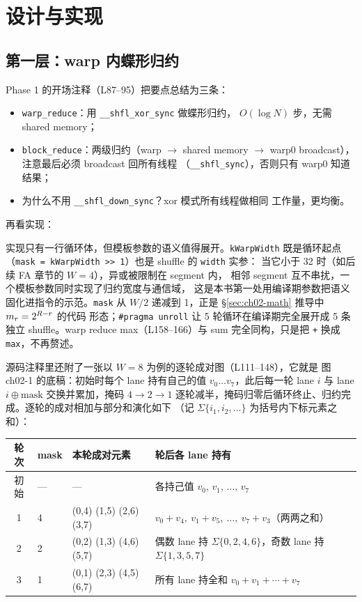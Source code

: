 \section{设计与实现}

\subsection{第一层：warp 内蝶形归约}\label{sec:ch02-warp}

Phase 1 的开场注释（L87--95）把要点总结为三条：

\begin{itemize}
\item \texttt{warp\_reduce}：用 \texttt{\_\_shfl\_xor\_sync} 做蝶形归约，
  $O(\log N)$ 步，无需 shared memory；
\item \texttt{block\_reduce}：两级归约（warp $\to$ shared memory $\to$
  warp0 broadcast），注意最后必须 broadcast 回所有线程
  （\texttt{\_\_shfl\_sync}），否则只有 warp0 知道结果；
\item 为什么不用 \texttt{\_\_shfl\_down\_sync}？xor 模式所有线程做相同
  工作量，更均衡。
\end{itemize}

再看实现：



实现只有一行循环体，但模板参数的语义值得展开。\texttt{kWarpWidth} 既是循环起点
（\texttt{mask = kWarpWidth >> 1}）也是 shuffle 的 \texttt{width} 实参：
当它小于 32 时（如后续 FA 章节的 $W = 4$），异或被限制在 segment 内，
相邻 segment 互不串扰，一个模板参数同时实现了归约宽度与通信域，
这是本书第一处用编译期参数把语义固化进指令的示范。\texttt{mask} 从
$W/2$ 递减到 1，正是 \S\ref{sec:ch02-math} 推导中 $m\sb r = 2^{R-r}$ 的代码
形态；\texttt{\#pragma unroll} 让 5 轮循环在编译期完全展开成 5 条独立
shuffle。warp reduce max（L158--166）与 sum 完全同构，只是把 \texttt{+}
换成 \texttt{max}，不再赘述。

源码注释里还附了一张以 $W=8$ 为例的逐轮成对图（L111--148），它就是
图 ch02-1 的底稿：初始时每个 lane 持有自己的值 $v_0 \dots v_7$，此后每一轮
lane $i$ 与 lane $i \oplus \mathrm{mask}$ 交换并累加，掩码 $4 \to 2 \to 1$
逐轮减半，掩码归零后循环终止、归约完成。逐轮的成对相加与部分和演化如下
（记 $\Sigma\{i_1, i_2, \dots\}$ 为括号内下标元素之和）：

\begin{center}
\begin{tabular}{clp{4.2cm}p{6.2cm}}
\toprule
轮次 & mask & 本轮成对元素 & 轮后各 lane 持有 \\
\midrule
初始 & --- & --- & 各持己值 $v_0,\, v_1,\, \dots,\, v_7$ \\
1 & 4 & (0,4) (1,5) (2,6) (3,7) & $v_0{+}v_4,\ v_1{+}v_5,\ \dots,\ v_7{+}v_3$（两两之和） \\
2 & 2 & (0,2) (1,3) (4,6) (5,7) & 偶数 lane 持 $\Sigma\{0,2,4,6\}$，奇数 lane 持 $\Sigma\{1,3,5,7\}$ \\
3 & 1 & (0,1) (2,3) (4,5) (6,7) & 所有 lane 持全和 $v_0 + v_1 + \cdots + v_7$ \\
\bottomrule
\end{tabular}
\end{center}

